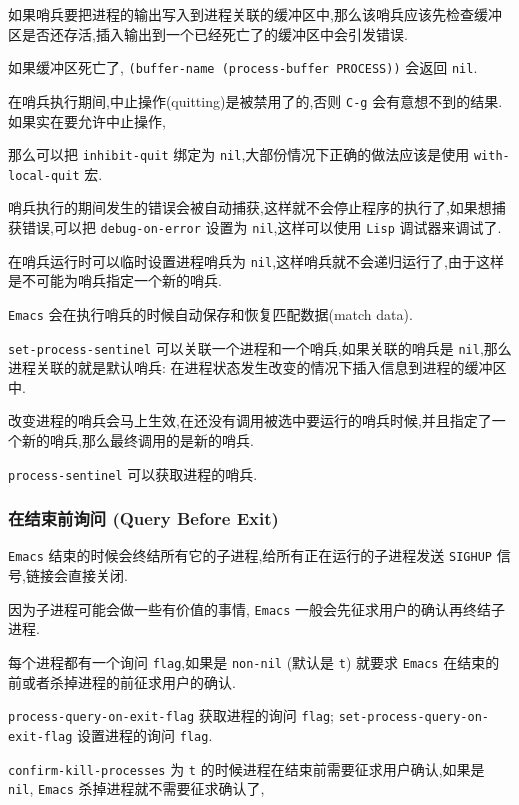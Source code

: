 \documentclass[11pt]{article}
\begin{document}
如果哨兵要把进程的输出写入到进程关联的缓冲区中,那么该哨兵应该先检查缓冲区是否还存活,插入输出到一个已经死亡了的缓冲区中会引发错误.

如果缓冲区死亡了, \texttt{(buffer-name (process-buffer PROCESS))} 会返回 \texttt{nil}.

在哨兵执行期间,中止操作(quitting)是被禁用了的,否则 \texttt{C-g} 会有意想不到的结果.如果实在要允许中止操作,

那么可以把 \texttt{inhibit-quit} 绑定为 \texttt{nil},大部份情况下正确的做法应该是使用 \texttt{with-local-quit} 宏.

哨兵执行的期间发生的错误会被自动捕获,这样就不会停止程序的执行了,如果想捕获错误,可以把 \texttt{debug-on-error} 设置为 \texttt{nil},这样可以使用 \texttt{Lisp} 调试器来调试了.

在哨兵运行时可以临时设置进程哨兵为 \texttt{nil},这样哨兵就不会递归运行了,由于这样是不可能为哨兵指定一个新的哨兵.

\texttt{Emacs} 会在执行哨兵的时候自动保存和恢复匹配数据(match data).

\texttt{set-process-sentinel} 可以关联一个进程和一个哨兵,如果关联的哨兵是 \texttt{nil},那么进程关联的就是默认哨兵: 在进程状态发生改变的情况下插入信息到进程的缓冲区中.

改变进程的哨兵会马上生效,在还没有调用被选中要运行的哨兵时候,并且指定了一个新的哨兵,那么最终调用的是新的哨兵.

\texttt{process-sentinel} 可以获取进程的哨兵.


\subsubsection{在结束前询问 (Query Before Exit)}
\label{sec:orga144681}

\texttt{Emacs} 结束的时候会终结所有它的子进程,给所有正在运行的子进程发送 \texttt{SIGHUP} 信号,链接会直接关闭.

因为子进程可能会做一些有价值的事情, \texttt{Emacs} 一般会先征求用户的确认再终结子进程.

每个进程都有一个询问 \texttt{flag},如果是 \texttt{non-nil} (默认是 \texttt{t}) 就要求 \texttt{Emacs} 在结束的前或者杀掉进程的前征求用户的确认.

\texttt{process-query-on-exit-flag} 获取进程的询问 \texttt{flag}; \texttt{set-process-query-on-exit-flag} 设置进程的询问 \texttt{flag}.

\texttt{confirm-kill-processes} 为 \texttt{t} 的时候进程在结束前需要征求用户确认,如果是 \texttt{nil}, \texttt{Emacs} 杀掉进程就不需要征求确认了,
\end{document}
